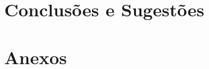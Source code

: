 \documentclass[a4paper]{article}
\begin{document}
\clearpage
\section{Conclusões e Sugestões} 

\hspace{3mm} 


\newpage



\newpage
\section{Anexos}

\begin{lstlisting}[language=XML, caption=Ficheiro \emph{XML} de modelação do sistema solar.]
    
\end{lstlisting}
\end{document}
